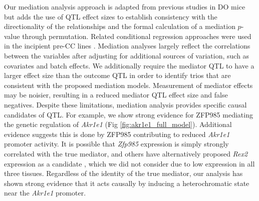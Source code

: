 \documentclass[10pt,letterpaper]{article}
\begin{document}
Our mediation analysis approach is adapted from previous studies in DO mice \cite{Chick2016,Keller2018,Skelly2019} but adds the use of QTL effect sizes to establish consistency with the directionality of the relationships and the formal calculation of a mediation $p$-value through permutation.  Related conditional regression approaches were used in the incipient pre-CC lines \cite{Rutledge2014, Kelada2014}.
Mediation analyses largely reflect the correlations between the variables after adjusting for additional sources of variation, such as covariates and batch effects. We additionally require the mediator QTL to have a larger effect size than the outcome QTL in order to identify trios that are consistent with the proposed mediation models. Measurement of mediator effects may be noisier, resulting in a reduced mediator QTL effect size and false negatives. 
Despite these limitations, mediation analysis provides specific causal candidates of QTL. For example, we show strong evidence for ZFP985 mediating the genetic regulation of \textit{Akr1e1} (Fig \ref{fig:akr1e1_full_model}). Additional evidence suggests this is done by ZFP985 contributing to reduced \textit{Akr1e1} promoter activity. It is possible that \textit{Zfp985} expression is simply strongly correlated with the true mediator, and others have alternatively proposed \textit{Rex2} expression as a candidate \cite{HamiltonWilliams2010}, which we did not consider due to low expression in all three tissues. Regardless of the identity of the true mediator, our analysis has shown strong evidence that it acts causally by inducing a heterochromatic state near the \textit{Akr1e1} promoter.
\end{document}

